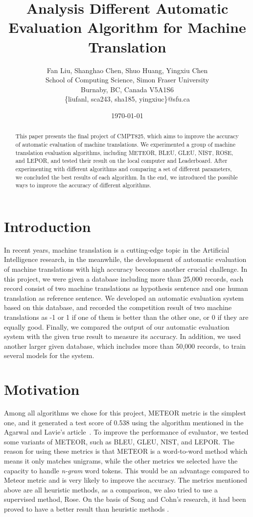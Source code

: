 \documentclass[11pt]{article}
\title{Analysis Different Automatic Evaluation Algorithm for Machine Translation  }
\author{Fan Liu, Shanghao Chen, Shuo Huang, Yingxiu Chen   \\
  School of Computing Science, Simon Fraser University \\
  Burnaby, BC, Canada V5A1S6 \\
  \{liufanl, sca243, sha185, yingxiuc\}@sfu.ca \\
  }
\date{\today}
\begin{document}
\maketitle
\begin{abstract}
This paper presents the final project of CMPT825, which aims to improve the accuracy of automatic evaluation of machine translations. We experimented a group of machine translation evaluation algorithms, including METEOR, BLEU, GLEU, NIST, ROSE, and LEPOR, and tested their result on the local computer and Leaderboard. After experimenting with different algorithms and comparing a set of different parameters, we concluded the best results of each algorithm. In the end, we introduced the possible ways to improve the accuracy of different algorithms.    
\end{abstract}




\section{Introduction}

In recent years, machine translation is a cutting-edge topic in the Artificial Intelligence research, in the meanwhile, the development of automatic evaluation of machine translations with high accuracy becomes another crucial challenge. In this project, we were given a database including more than 25,000 records, each record consist of two machine translations as hypothesis sentence and one human translation as reference sentence. We developed an automatic evaluation system based on this database, and recorded the competition result of two machine translations as -1 or 1 if one of them is better than the other one, or 0 if they are equally good. Finally, we compared the output of our automatic evaluation system with the given true result to measure its accuracy. In addition, we used another larger given database, which includes more than 50,000 records, to train several models for the system.

\section{Motivation}
Among all algorithms we chose for this project, METEOR metric is the simplest one, and it generated a test score of 0.538 using the algorithm mentioned in the Agarwal and Lavie's article~\cite{StatMT:07}. To improve the performance of evaluator, we tested some variants of METEOR, such as BLEU, GLEU, NIST, and LEPOR. The reason for using these metrics is that METEOR is a word-to-word method which means it only matches unigrams, while the other metrics we selected have the capacity to handle \emph{n-gram} word tokens. This would be an advantage compared to Meteor metric and is very likely to improve the accuracy. The metrics mentioned above are all heuristic methods, as a comparison, we also tried to use a supervised method, Rose. On the basis of Song and Cohn's research, it had been proved to have a better result than heuristic methods \cite{WMT:11}.
\end{document}
